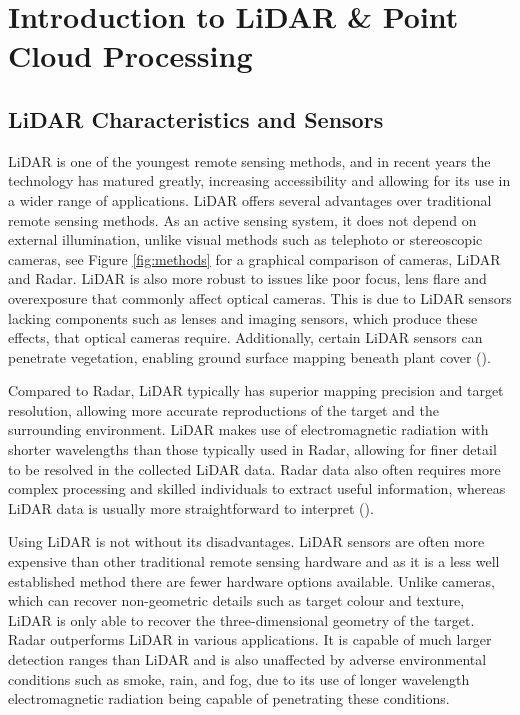 \chapter{Introduction to LiDAR \& Point Cloud Processing}
\label{ch:theory}

\section{LiDAR Characteristics and Sensors}
\label{sec:ch3:section1}

\ac{LiDAR} is one of the youngest remote sensing methods, and in recent years the technology has matured greatly, increasing accessibility and allowing for its use in a wider range of applications. \ac{LiDAR} offers several advantages over traditional remote sensing methods. As an active sensing system, it does not depend on external illumination, unlike visual methods such as telephoto or stereoscopic cameras, see Figure \ref{fig:methods} for a graphical comparison of cameras, \ac{LiDAR} and \ac{Radar}. \ac{LiDAR} is also more robust to issues like poor focus, lens flare and overexposure that commonly affect optical cameras. This is due to \ac{LiDAR} sensors lacking components such as lenses and imaging sensors, which produce these effects, that optical cameras require. Additionally, certain \ac{LiDAR} sensors can penetrate vegetation, enabling ground surface mapping beneath plant cover (\cite{wangChallengesOpportunitiesLidar2021}).

Compared to \ac{Radar}, \ac{LiDAR} typically has superior mapping precision and target resolution, allowing more accurate reproductions of the target and the surrounding environment. \ac{LiDAR} makes use of electromagnetic radiation with shorter wavelengths than those typically used in \ac{Radar}, allowing for finer detail to be resolved in the collected \ac{LiDAR} data. \ac{Radar} data also often requires more complex processing and skilled individuals to extract useful information, whereas \ac{LiDAR} data is usually more straightforward to interpret (\cite{agrawalComparativeAssesmentRemote2019}).

Using \ac{LiDAR} is not without its disadvantages. \ac{LiDAR} sensors are often more expensive than other traditional remote sensing hardware and as it is a less well established method there are fewer hardware options available. Unlike cameras, which can recover non-geometric details such as target colour and texture, \ac{LiDAR} is only able to recover the three-dimensional geometry of the target. \ac{Radar} outperforms \ac{LiDAR} in various applications. It is capable of much larger detection ranges than \ac{LiDAR} and is also unaffected by adverse environmental conditions such as smoke, rain, and fog, due to its use of longer wavelength electromagnetic radiation being capable of penetrating these conditions.

